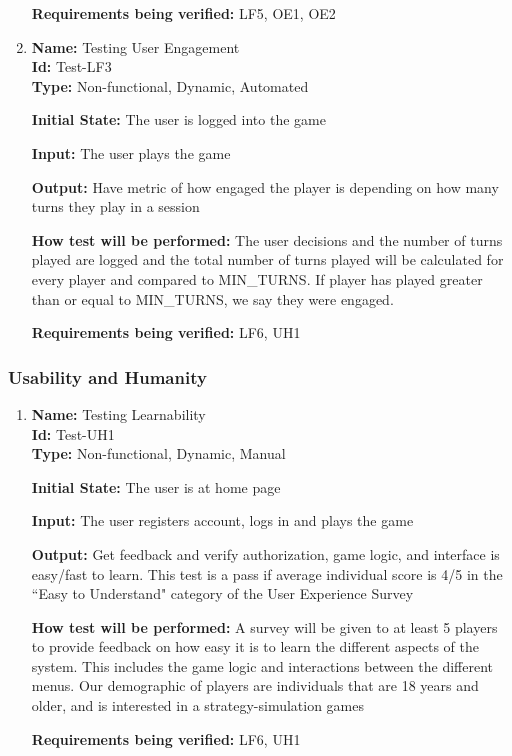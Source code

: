\documentclass[12pt, titlepage]{article}
\begin{document}
\begin{enumerate}
\textbf{Requirements being verified:} LF5, OE1, OE2

\item{\textbf{Name: }Testing User Engagement \\}\label{Test-LF3}
\textbf{Id: }Test-LF3\\

\textbf{Type:} Non-functional, Dynamic, Automated
					
\textbf{Initial State:} The user is logged into the game
					
\textbf{Input:} The user plays the game
					
\textbf{Output: }Have metric of how engaged the player is depending on how many turns they play in a session
					
\textbf{How test will be performed:} The user decisions and the number of turns played are logged and the total number of turns played will be calculated for every player and compared to MIN\_TURNS. If player has played greater than or equal to MIN\_TURNS, we say they were engaged.

\textbf{Requirements being verified:} LF6, UH1

\end{enumerate}

\subsubsection{Usability and Humanity}
\begin{enumerate}
    \item{\textbf{Name: }Testing Learnability\\}\label{Test-UH1}
    \textbf{Id: }Test-UH1\\


    \textbf{Type: }Non-functional, Dynamic, Manual
    					
    \textbf{Initial State:} The user is at home page
    					
   \textbf{Input: }The user registers account, logs in and plays the game
    					
   \textbf{Output:} Get feedback and verify authorization, game logic, and interface is easy/fast to learn. This test is a pass if average individual score is 4/5 in the ``Easy to Understand" category of the User Experience Survey
    					
    \textbf{How test will be performed: } A survey will be given to at least 5 players to provide feedback on how easy it is to learn the different aspects of the system. This includes the game logic and interactions between the different menus.  Our demographic of players are individuals that are 18 years and older, and is interested in a strategy-simulation games  
    
    \textbf{Requirements being verified:} LF6, UH1
\end{enumerate}
\end{document}
